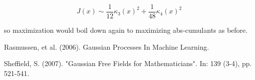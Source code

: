 \documentclass[11pt]{article}
\theoremstyle{plain} %
\theoremstyle{remark}
\begin{document}
$$
J(x) \sim \frac{1}{12} \kappa_{3}(x)^{2}+\frac{1}{48} \kappa_{4}(x)^{2}
$$

so maximization would boil down again to maximizing abs-cumulants as before.



\begin{thebibliography}{2}
  Rasmussen, et al. (2006). Gaussian Processes In Machine Learning.

  Sheffield, S. (2007). "Gaussian Free Fields for Mathematicians". In: 139 (3-4), pp. 521-541.
\end{thebibliography}
\end{document}
